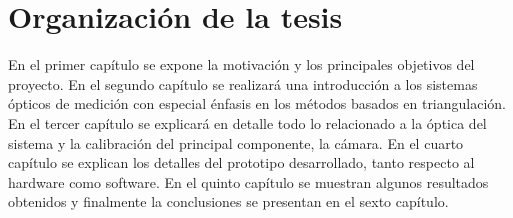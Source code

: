 



\section{Organización de la tesis}
En el primer capítulo se expone la motivación y los principales objetivos del proyecto.
En el segundo capítulo se realizará una introducción a los sistemas ópticos de medición con especial énfasis en los métodos basados en triangulación. En el tercer capítulo se explicará en detalle todo lo relacionado a la óptica del sistema y la calibración del principal componente, la cámara. En el cuarto capítulo se explican los detalles del prototipo desarrollado, tanto respecto al hardware como software. En el quinto capítulo se muestran algunos resultados obtenidos y finalmente la conclusiones se presentan en el sexto capítulo. 




